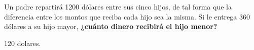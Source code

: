 Un padre repartirá 1200 dólares entre sus cinco hijos, de tal forma que la diferencia entre los montos que reciba cada hijo sea la misma.
Si le entrega 360 dólares a su hijo mayor,
\textbf{¿cuánto dinero recibirá el hijo menor?}

\begin{solutionbox}{2cm}
    120 dolares.
\end{solutionbox}